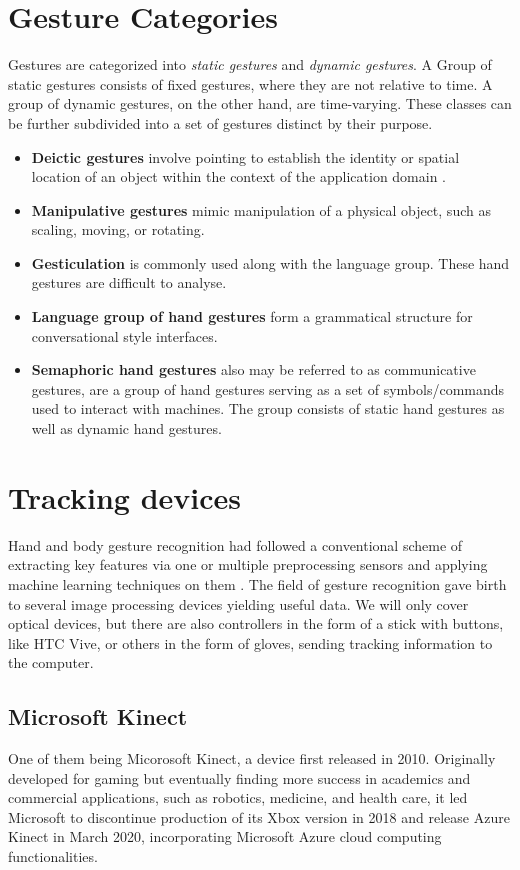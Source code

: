 
\section{Gesture Categories}
Gestures are categorized into \textit{static gestures} and \textit{dynamic gestures}. A Group of static gestures consists of fixed gestures, where they are not relative to time. A group of dynamic gestures, on the other hand, are time-varying. These classes can be further subdivided into a set of gestures distinct by their purpose.


\begin{itemize}
	\item \textbf{Deictic gestures} involve pointing to establish the identity or spatial location of an object within the context of the application domain \cite{taxonomi}.
    \item \textbf{Manipulative gestures} mimic manipulation of a physical object, such as scaling, moving, or rotating.
    \item \textbf{Gesticulation} is commonly used along with the language group. These hand gestures are difficult to analyse.
	\item \textbf{Language group of hand gestures} form a grammatical structure for conversational style interfaces.
    \item \textbf{Semaphoric hand gestures} also may be referred to as communicative gestures, are a group of hand gestures serving as a set of symbols/commands used to interact with machines. The group consists of static hand gestures as well as dynamic hand gestures. 
\end{itemize}


\section{Tracking devices}
Hand and body gesture recognition had followed a conventional scheme of extracting key features via one or multiple preprocessing sensors and applying machine learning techniques on them \cite{avola}. The field of gesture recognition gave birth to several image processing devices yielding useful data.
We will only cover optical devices, but there are also controllers in the form of a stick with buttons, like HTC Vive, or others in the form of gloves, sending tracking information to the computer.
\subsection{Microsoft Kinect}
One of them being Micorosoft Kinect, a device first released in 2010. Originally developed for gaming but eventually finding more success in academics and commercial applications, such as robotics, medicine, and health care, it led Microsoft to discontinue production of its Xbox version in 2018 and release Azure Kinect in March 2020, incorporating Microsoft Azure cloud computing functionalities.


